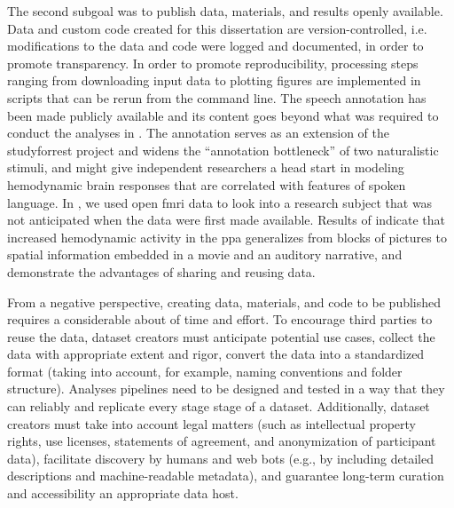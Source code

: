 
%

%
The second subgoal was to publish data, materials, and results openly available.
%
Data and custom code created for this dissertation are version-controlled, i.e.
modifications to the data and code were logged and documented, in order to
promote transparency.
%
In order to promote reproducibility, processing steps ranging from downloading
input data to plotting figures are implemented in scripts that can be rerun from
the command line.
%
The speech annotation has been made publicly available
\citep{haeusler2021speechanno} and its content goes beyond what was required to
conduct the analyses in \citet{haeusler2022processing}.
%
The annotation serves as an extension of the studyforrest project and widens the
``annotation bottleneck'' \citep[][p.  16]{aliko2020naturalistic} of two
naturalistic stimuli, and might give independent researchers a head start in
modeling hemodynamic brain responses that are correlated with features of spoken
language.
%
In \citet{haeusler2022processing}, we used open \ac{fmri} data to look into a
research subject that was not anticipated when the data were first made
available.
%
Results of \citet{haeusler2022processing} indicate that increased hemodynamic
activity in the \ac{ppa} generalizes from blocks of pictures to spatial
information embedded in a movie and an auditory narrative, and demonstrate the
advantages of sharing and reusing data.

From a negative perspective, creating data, materials, and code to be published
requires a considerable about of time and effort.
%
To encourage third parties to reuse the data, dataset creators must anticipate
potential use cases, collect the data with appropriate extent and rigor, convert
the data into a standardized format (taking into account, for example, naming
conventions and folder structure).
Analyses pipelines need to be designed and tested in a way that they can
reliably and replicate every stage stage of a dataset.
Additionally, dataset creators must take into account legal matters (such as
intellectual property rights, use licenses, statements of agreement, and
anonymization of participant data), facilitate discovery by humans and web bots
(e.g., by including detailed descriptions and machine-readable metadata), and
guarantee long-term curation and accessibility an appropriate data host.

